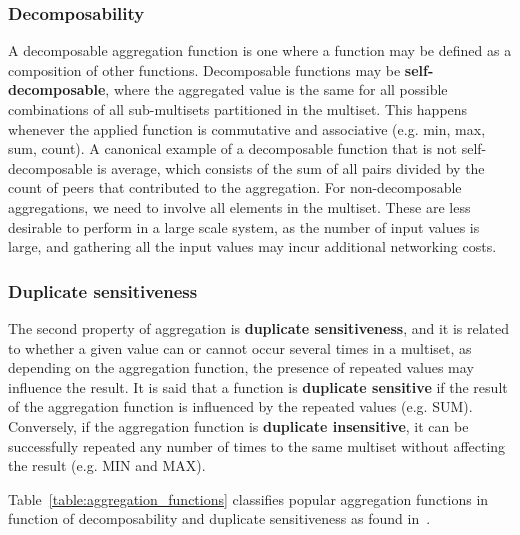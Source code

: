 \subsubsection*{Decomposability}

A decomposable aggregation function is one where a function may be defined as a composition of other functions. Decomposable functions may be \textbf{self-decomposable}, where the aggregated value is the same for all possible combinations of all sub-multisets partitioned in the multiset. This happens whenever the applied function is commutative and associative (e.g. min, max, sum, count). A canonical example of a decomposable function that is not self-decomposable is average, which consists of the sum of all pairs divided by the count of peers that contributed to the aggregation. For non-decomposable aggregations, we need to involve all elements in the multiset. These are less desirable to perform in a large scale system, as the number of input values is large, and gathering all the input values may incur additional networking costs.


\subsubsection*{Duplicate sensitiveness}

The second property of aggregation is \textbf{duplicate sensitiveness}, and it is related to whether a given value can or cannot occur several times in a multiset, as depending on the aggregation function, the presence of repeated values may influence the result. It is said that a function is \textbf{duplicate sensitive} if the result of the aggregation function is influenced by the repeated values (e.g. SUM). Conversely, if the aggregation function is \textbf{duplicate insensitive}, it can be successfully repeated any number of times to the same multiset without affecting the result (e.g. MIN and MAX).

Table~\ref{table:aggregation_functions} classifies popular aggregation functions in function of decomposability and duplicate sensitiveness as found in~\cite{DBLP:journals/corr/abs-1110-0725}.

